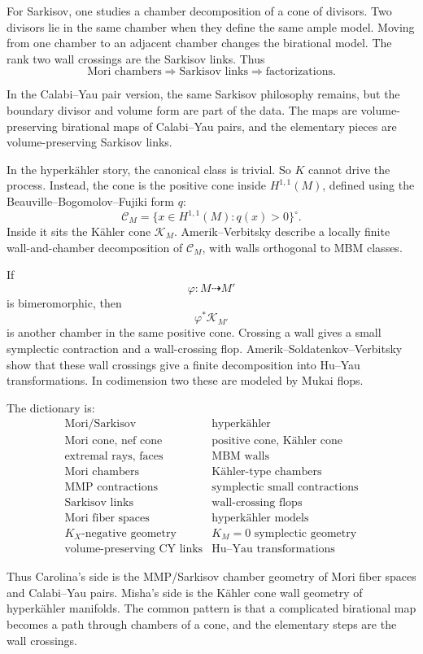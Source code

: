 \medskip\noindent
For Sarkisov, one studies a chamber
decomposition of a cone of divisors.
Two divisors lie in the same chamber
when they define the same ample model.
Moving from one chamber to an
adjacent chamber changes the
birational model.
The rank two wall crossings are the
Sarkisov links.
Thus
$$
\text{Mori chambers}
\Rightarrow
\text{Sarkisov links}
\Rightarrow
\text{factorizations}.
$$

\medskip\noindent
In the Calabi--Yau pair version,
the same Sarkisov philosophy remains,
but the boundary divisor and volume
form are part of the data.
The maps are volume-preserving
birational maps of Calabi--Yau pairs,
and the elementary pieces are
volume-preserving Sarkisov links.

\medskip\noindent
In the hyperk\"ahler story, the
canonical class is trivial.
So $K$ cannot drive the process.
Instead, the cone is the positive cone
inside $H^{1,1}(M)$, defined using
the Beauville--Bogomolov--Fujiki form
$q$:
$$
\mathcal C_M
=
\{x\in H^{1,1}(M):q(x)>0\}^{\circ}.
$$
Inside it sits the K\"ahler cone
$\mathcal K_M$.
Amerik--Verbitsky describe a locally
finite wall-and-chamber decomposition
of $\mathcal C_M$, with walls
orthogonal to MBM classes.

\medskip\noindent
If
$$
\varphi:M\dashrightarrow M'
$$
is bimeromorphic, then
$$
\varphi^*\mathcal K_{M'}
$$
is another chamber in the same
positive cone.
Crossing a wall gives a small
symplectic contraction and a
wall-crossing flop.
Amerik--Soldatenkov--Verbitsky show
that these wall crossings give a
finite decomposition into Hu--Yau
transformations.
In codimension two these are modeled
by Mukai flops.

\medskip\noindent
The dictionary is:
$$
\begin{array}{c|c}
\text{Mori/Sarkisov} &
\text{hyperk\"ahler} \\
\hline
\text{Mori cone, nef cone} &
\text{positive cone, K\"ahler cone} \\
\text{extremal rays, faces} &
\text{MBM walls} \\
\text{Mori chambers} &
\text{K\"ahler-type chambers} \\
\text{MMP contractions} &
\text{symplectic small contractions} \\
\text{Sarkisov links} &
\text{wall-crossing flops} \\
\text{Mori fiber spaces} &
\text{hyperk\"ahler models} \\
K_X\text{-negative geometry} &
K_M=0\text{ symplectic geometry} \\
\text{volume-preserving CY links} &
\text{Hu--Yau transformations}
\end{array}
$$

\medskip\noindent
Thus Carolina's side is the
MMP/Sarkisov chamber geometry of
Mori fiber spaces and Calabi--Yau
pairs.
Misha's side is the K\"ahler cone
wall geometry of hyperk\"ahler
manifolds.
The common pattern is that a
complicated birational map becomes a
path through chambers of a cone, and
the elementary steps are the wall
crossings.



